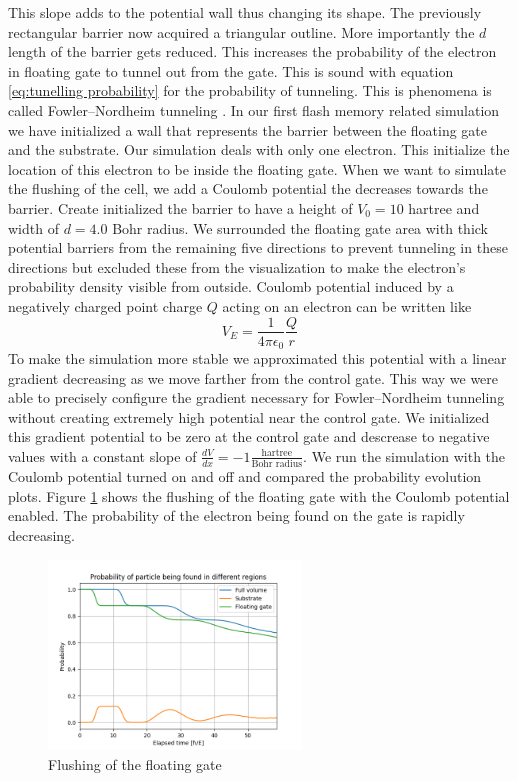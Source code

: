 This slope adds to the potential wall thus changing its shape.
The previously rectangular barrier now acquired a triangular outline. More importantly the $d$ length of the barrier gets reduced.
This increases the probability of the electron in floating gate to tunnel out from the gate. This is sound with equation \ref{eq:tunelling probability} for the probability of tunneling.
This is phenomena is called Fowler–Nordheim tunneling \cite{Fowler_1928bv}.
In our first flash memory related simulation we have initialized a wall that represents the barrier between the floating gate and the substrate.
Our simulation deals with only one electron.
This initialize the location of this electron to be inside the floating gate.
When we want to simulate the flushing of the cell, we add a Coulomb potential the decreases towards the barrier.
Create initialized the barrier to have a height of $V_0 = 10$ hartree and width of $d = 4.0$ Bohr radius.
We surrounded the floating gate area with thick potential barriers from the remaining five directions to prevent tunneling in these directions but excluded these from the visualization to make the electron's probability density visible from outside.
Coulomb potential induced by a negatively charged point charge $Q$ acting on an electron can be written like
\begin{equation}
	\label{eq:coulomb_potential}
	V_E = \frac{1}{4\pi \epsilon_0}\frac{Q}{r}
\end{equation}
To make the simulation more stable we approximated this potential with a linear gradient decreasing as we move farther from the control gate.
This way we were able to precisely configure the gradient necessary for Fowler–Nordheim tunneling without creating extremely high potential near the control gate.
We initialized this gradient potential to be zero at the control gate and descrease to negative values with a constant slope of $\frac{dV}{dx}=-1\frac{\text{hartree}}{\text{Bohr radius}}$.
We run the simulation with the Coulomb potential turned on and off and compared the probability evolution plots.
Figure \ref{fig:flash_flush_plot} shows the flushing of the floating gate with the Coulomb potential enabled.
The probability of the electron being found on the gate is rapidly decreasing.
\begin{figure}
	\centering
	\includegraphics[width=0.6\textwidth]{figures/flash_flush.png}
	\caption{Flushing of the floating gate}
	\label{fig:flash_flush_plot}
\end{figure}
